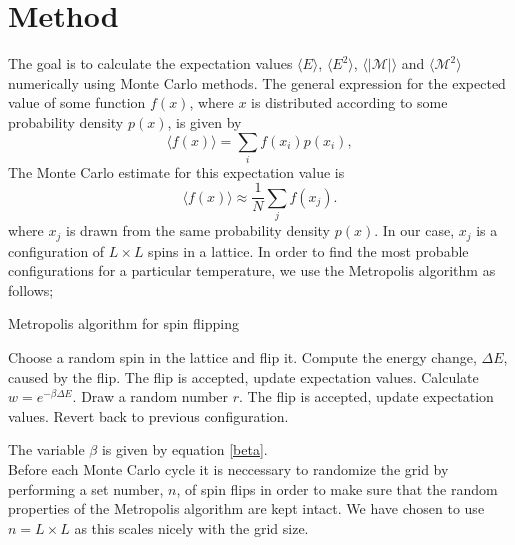 \documentclass[notitlepage, reprint, nofootinbib]{revtex4-1}
\begin{document}
\section{Method}
The goal is to calculate the expectation values $\langle E\rangle$, $\langle E^2\rangle$, $\langle |\mathcal{M}|\rangle$ and $\langle\mathcal{M}^2\rangle$ numerically using Monte Carlo methods. The general expression for the expected value of some function $f(x)$, where $x$ is distributed according to some probability density $p(x)$, is given by
\begin{equation}\label{exp_val}\langle f(x)\rangle =\sum_i f(x_i)p(x_i),\end{equation}
The Monte Carlo estimate for this expectation value is 
\begin{equation}\label{MC}\langle f(x)\rangle \approx \frac{1}{N}\sum_j f(x_j).\end{equation}
where $x_j$ is drawn from the same probability density $p(x)$. In our case, $x_j$ is a configuration of $L\times L$ spins in a lattice. In order to find the most probable configurations for a particular temperature, we use the Metropolis algorithm as follows;
\begin{algorithm}[H]
	\caption{Metropolis algorithm for spin flipping}
	\begin{algorithmic}[1]
		\State Choose a random spin in the lattice and flip it.
		\State Compute the energy change, $\Delta E$, caused by the flip.
			\State The flip is accepted, update expectation values. 
			\State Calculate $w=e^{-\beta\Delta E}$.
			\State Draw a random number $r$.
				\State The flip is accepted, update expectation values.
			\Else
				\State Revert back to previous configuration.
			\EndIf
		\EndIf
	\end{algorithmic}
\end{algorithm}
The variable $\beta$ is given by equation \ref{beta}.\\[2mm]
Before each Monte Carlo cycle it is neccessary to randomize the grid by performing a set number, $n$, of spin flips in order to make sure that the random properties of the Metropolis algorithm are kept intact. We have chosen to use $n=L\times L$ as this scales nicely with the grid size. 
\end{document}
